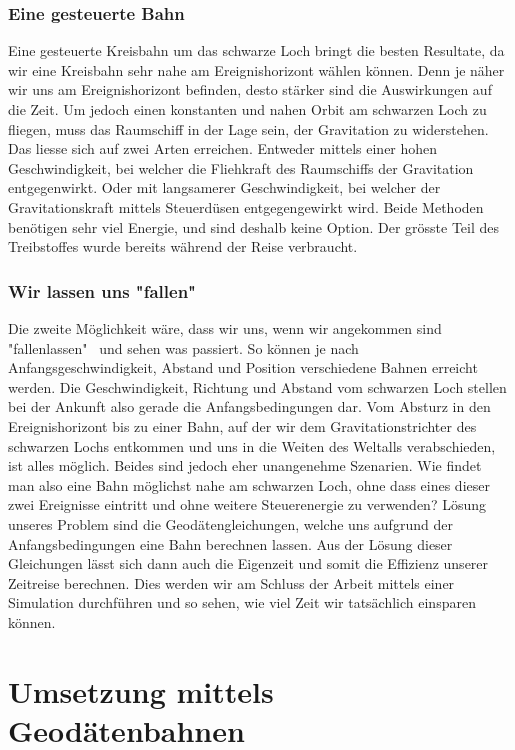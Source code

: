 \begin{refsection}
	\subsubsection{Eine gesteuerte Bahn}
	Eine gesteuerte Kreisbahn um das schwarze Loch bringt die besten Resultate, da wir eine Kreisbahn sehr nahe am Ereignishorizont wählen können. Denn je näher wir uns am Ereignishorizont befinden, desto stärker sind die Auswirkungen auf die Zeit. 
	Um jedoch einen konstanten und nahen Orbit am schwarzen Loch zu fliegen, muss das Raumschiff in der Lage sein, der Gravitation zu widerstehen. Das liesse sich auf zwei Arten erreichen. Entweder mittels einer hohen Geschwindigkeit, bei welcher die Fliehkraft des Raumschiffs der Gravitation entgegenwirkt. Oder mit langsamerer Geschwindigkeit, bei welcher der Gravitationskraft mittels Steuerdüsen entgegengewirkt wird. 
	Beide Methoden benötigen sehr viel Energie, und sind deshalb keine Option. Der grösste Teil des Treibstoffes wurde bereits während der Reise  verbraucht.
	\subsubsection{Wir lassen uns "fallen"}
	
	Die zweite Möglichkeit wäre, dass wir uns, wenn wir angekommen sind "fallenlassen" \ und sehen was passiert. So können je nach Anfangsgeschwindigkeit, Abstand und Position verschiedene Bahnen erreicht werden. Die Geschwindigkeit, Richtung und Abstand vom schwarzen Loch stellen bei der Ankunft also gerade die Anfangsbedingungen dar. Vom Absturz in den Ereignishorizont bis zu einer Bahn, auf der wir dem Gravitationstrichter des schwarzen Lochs entkommen und uns in die Weiten des Weltalls verabschieden, ist alles möglich. Beides sind jedoch eher unangenehme Szenarien. 
	Wie findet man also eine Bahn möglichst nahe am schwarzen Loch, ohne dass eines dieser zwei Ereignisse eintritt und ohne weitere Steuerenergie zu verwenden?
	Lösung unseres Problem sind die Geodätengleichungen, welche uns aufgrund der Anfangsbedingungen eine Bahn berechnen lassen. Aus der Lösung dieser Gleichungen lässt sich dann auch die Eigenzeit und somit die Effizienz unserer Zeitreise berechnen. Dies werden wir am Schluss der Arbeit mittels einer Simulation durchführen und so sehen, wie viel Zeit wir tatsächlich einsparen können.
	
	\section{Umsetzung mittels Geodätenbahnen}
	

\end{refsection}
